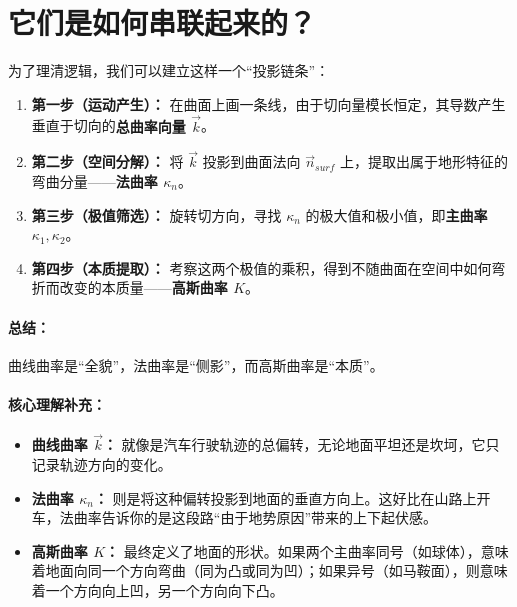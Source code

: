 \section{它们是如何串联起来的？}
为了理清逻辑，我们可以建立这样一个“投影链条”：
\begin{enumerate}
\item \textbf{第一步（运动产生）：} 在曲面上画一条线，由于切向量模长恒定，其导数产生垂直于切向的\textbf{总曲率向量 $\vec{k}$}。
\item \textbf{第二步（空间分解）：} 将 $\vec{k}$ 投影到曲面法向 $\vec{n}_{surf}$ 上，提取出属于地形特征的弯曲分量——\textbf{法曲率 $\kappa_n$}。
\item \textbf{第三步（极值筛选）：} 旋转切方向，寻找 $\kappa_n$ 的极大值和极小值，即\textbf{主曲率 $\kappa_1, \kappa_2$}。
\item \textbf{第四步（本质提取）：} 考察这两个极值的乘积，得到不随曲面在空间中如何弯折而改变的本质量——\textbf{高斯曲率 $K$}。
\end{enumerate}
\paragraph{总结：}
曲线曲率是“全貌”，法曲率是“侧影”，而高斯曲率是“本质”。
\paragraph{核心理解补充：}
\begin{itemize}
\item \textbf{曲线曲率 $\vec{k}$：} 就像是汽车行驶轨迹的总偏转，无论地面平坦还是坎坷，它只记录轨迹方向的变化。
\item \textbf{法曲率 $\kappa_n$：} 则是将这种偏转投影到地面的垂直方向上。这好比在山路上开车，法曲率告诉你的是这段路“由于地势原因”带来的上下起伏感。
\item \textbf{高斯曲率 $K$：} 最终定义了地面的形状。如果两个主曲率同号（如球体），意味着地面向同一个方向弯曲（同为凸或同为凹）；如果异号（如马鞍面），则意味着一个方向向上凹，另一个方向向下凸。
\end{itemize}
